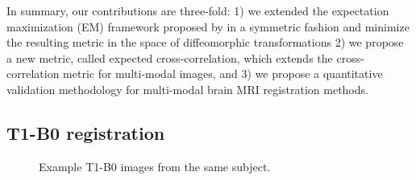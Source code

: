 In summary, our contributions are three-fold: 1) we extended the expectation maximization (EM) framework proposed by \cite{Arce-santana2014} in a symmetric fashion and minimize the resulting metric in the space of diffeomorphic transformations 2) we propose a new metric, called expected cross-correlation, which extends the cross-correlation metric for multi-modal images, and 3) we propose a quantitative validation methodology for multi-modal brain MRI registration methods.

\subsection{T1-B0 registration}

\begin{figure}[t!]
\centering
    \caption{Example T1-B0 images from the same subject.}
\label{fig:example_t1b0_problem}
\end{figure}

